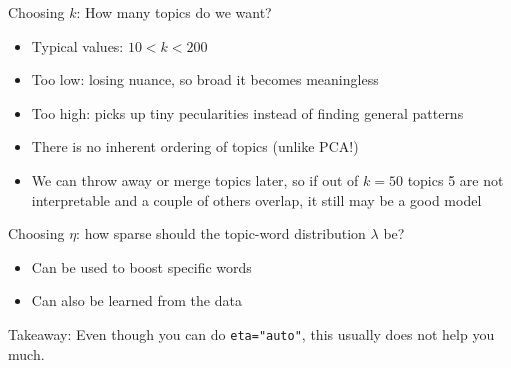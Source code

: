 \documentclass[compress]{beamer}
\begin{document}
\begin{frame}{Choosing $k$: How many topics do we want?}
	\begin{itemize}
		\item Typical values: $10<k<200$
		\item Too low: losing nuance, so broad it becomes meaningless
		\item Too high: picks up tiny pecularities instead of finding general patterns
		\item There is no inherent ordering of topics (unlike PCA!)
		\item We can throw away or merge topics later, so if out of $k=50$ topics 5 are not interpretable and a couple of others overlap, it still may be a good model
	\end{itemize}
\end{frame}




\begin{frame}{Choosing $\eta$: how sparse should the topic-word distribution $\lambda$ be?}
	\begin{itemize}
		\item Can be used to boost specific words
		\item Can also be learned from the data 
	\end{itemize}
	
	\pause
	Takeaway: Even though you can do \texttt{eta="auto"}, this usually does not help you much.
	
\end{frame}
\end{document}
